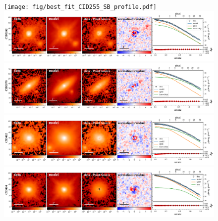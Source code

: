 \documentclass[apj]{emulateapj}
\begin{document}
\begin{figure}
\centering
{
\texttt{[image: fig/best\_fit\_CID255\_SB\_profile.pdf]}
\includegraphics[height=0.25\textwidth]{fig/best_fit_CID3242_SB_profile.pdf}
\includegraphics[height=0.25\textwidth]{fig/best_fit_CID3570_SB_profile.pdf}
\includegraphics[height=0.25\textwidth]{fig/best_fit_CID452_SB_profile.pdf}
\includegraphics[height=0.25\textwidth]{fig/best_fit_CID454_SB_profile.pdf}
}
\end{figure} 
\end{document}
